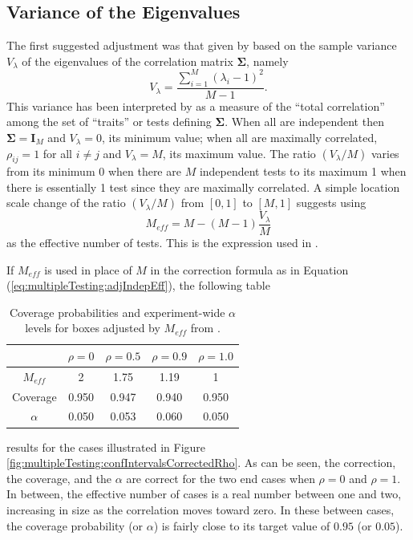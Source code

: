 \documentclass[letterpaper,12pt,oneside,final]{article}
\newcommand{\m}[1]{\mathbf{#1}}               %
\newcommand{\sm}[1]{\boldsymbol{#1}}   %
\begin{document}
\subsection{Variance of the Eigenvalues}

The first suggested adjustment was that given by \cite{cheverud2001} based on the sample variance $V_\lambda$  of the eigenvalues of the correlation matrix $\sm{\Sigma}$, namely
\[ V_\lambda = \frac{\sum_{i=1}^M (\lambda_i - 1)^2}{M-1}. \]
This variance has been interpreted by \cite{cheverud2001} as a measure of the ``total correlation'' among the set of ``traits'' or tests defining $\sm{\Sigma}$. When all are independent then $\sm{\Sigma} = \m{I}_M$ and $V_\lambda = 0$, its minimum value; when all are maximally correlated, $\rho_{ij} = 1$ for all $i \ne j$ and $V_\lambda = M$, its maximum value. The ratio $\left( V_\lambda / M \right)$ varies from its minimum 0 when there are $M$ independent tests to its maximum 1 when there is essentially 1 test since they are maximally correlated. A simple location scale change of the ratio $\left( V_\lambda / M \right)$ from $[0,1]$ to $[M, 1]$ suggests using
\begin{equation}
M_{eff} = M - (M-1) \frac{V_\lambda}{M} %
\label{eq:multipleTesting:meff_var}
\end{equation}
as the effective number of tests. This is the expression used in \cite{nyholt2004}.

If $M_{eff}$ is used in place of $M$ in the correction formula as in Equation (\ref{eq:multipleTesting:adjIndepEff}), the following table
\begin{table}[htp]
\begin{center}
\begin{tabular}{c|cccc}
& 
$\rho = 0$ &
$\rho = 0.5$ &
$\rho = 0.9$ &
$\rho = 1.0$ \\
\hline
$M_{eff}$ & 
2 &
1.75 &
1.19 &
1
\\
Coverage  &
0.950 &
0.947 &
0.940  &
0.950 
\\
$\alpha$  &
0.050 &
0.053 &
0.060 &
0.050

\end{tabular}
\end{center}
\caption{Coverage probabilities and experiment-wide $\alpha$ levels for boxes adjusted by $M_{eff}$ from \cite{cheverud2001}.}
\label{tab:multipleTesting:coverageMvar}
\end{table}
results for the cases illustrated in Figure \ref{fig:multipleTesting:confIntervalsCorrectedRho}.  As can be seen, the correction, the coverage, and the $\alpha$ are correct for the two end cases when $\rho = 0$ and $\rho = 1$.  In between, the effective number of cases is a real number between one and two, increasing in size as the correlation moves toward zero.  In these between cases, the coverage probability (or $\alpha$) is fairly close to its target value of $0.95$ (or $0.05$).
\end{document}

